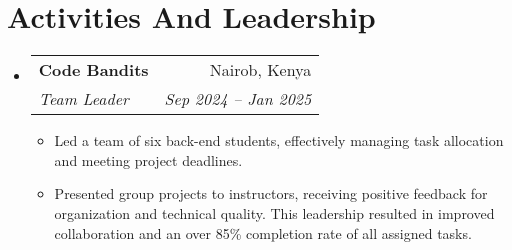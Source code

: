 \documentclass[letterpaper,11pt]{article}
\makeatletter
\newcommand{\resumeSubheading}[4]{
  \vspace{-1pt}\item
    \begin{tabular*}{0.97\textwidth}{l@{\extracolsep{\fill}}r}
      \textbf{#1} & #2 \\
      \textit{\small #3} & \textit{\small #4} \\
    \end{tabular*}\vspace{-5pt}
}
\newcommand{\resumeSubHeadingListStart}{\begin{itemize}[leftmargin=*]}
\newcommand{\resumeSubHeadingListEnd}{\end{itemize}}
\makeatother
\begin{document}
\section*{Activities And Leadership}
\resumeSubHeadingListStart
  \resumeSubheading
    {Code Bandits}{Nairob, Kenya}
    {Team Leader}{Sep 2024 -- Jan 2025}
    \begin{itemize}
      \item Led a team of six back-end students, effectively managing task allocation and meeting project deadlines.
      \item Presented group projects to instructors, receiving positive feedback for organization and technical quality. This leadership resulted in improved collaboration and an over 85\% completion rate of all assigned tasks.
    \end{itemize}
\resumeSubHeadingListEnd
\end{document}
